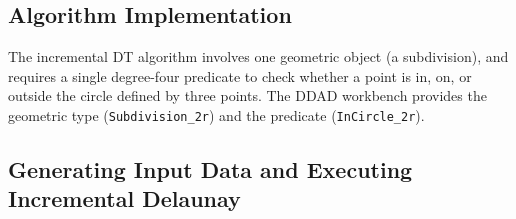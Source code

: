 % 





\FloatBarrier
\subsection{Algorithm Implementation}
 
The incremental DT algorithm involves one geometric object (a subdivision), and
requires a single degree-four predicate to check whether a point is in, on, or
outside the circle defined by three points. The DDAD workbench provides the
geometric type (\texttt{Subdivision\_2r}) and the predicate
(\texttt{InCircle\_2r}).  










\subsection{Generating Input Data and Executing Incremental Delaunay} 
